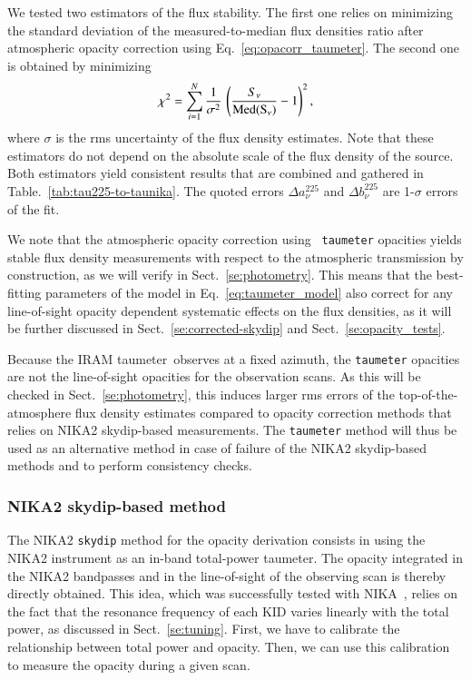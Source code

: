 \documentclass[traditionalabstract]{aa}
\newcommand{\taumeter}{taumeter}
\newcommand{\lp}[1]{#1}
\newcommand{\rev}[1]{#1}
\begin{document}
We tested two estimators of the flux stability. The first one relies
on minimizing the standard deviation of the measured-to-median flux
densities ratio after atmospheric opacity correction using
Eq.~\ref{eq:opacorr_taumeter}. The second one is obtained by minimizing
\begin{equation}
\chi^2 = \sum_{i=1}^{N} \frac{1}{\sigma^2} \, \left( \frac{S_\nu}{\rm{Med}(S_\nu)} -1 \right)^2,  
\end{equation}
where $\sigma$ is the rms uncertainty of the flux density estimates. Note
that these estimators do not depend on
the absolute scale of the flux density of the source. Both estimators
yield consistent results that are combined and gathered in
Table.~\ref{tab:tau225-to-taunika}. The quoted errors
$\Delta a_\nu^{225}$ and $\Delta b_\nu^{225}$ are 1-$\sigma$ errors of
the fit.

{\rev We note that the atmospheric opacity correction using {\tt
taumeter} opacities yields stable flux density measurements with
respect to the atmospheric transmission by construction, as we will
verify in Sect.~\ref{se:photometry}. This means that the best-fitting
parameters of the model in Eq.~\ref{eq:taumeter_model} also correct
for any line-of-sight opacity dependent systematic effects on the flux
densities, as it will be further discussed in
Sect.~\ref{se:corrected-skydip} and Sect.~\ref{se:opacity_tests}.}

Because the IRAM \taumeter\ observes at a fixed azimuth, the
{\tt taumeter} opacities are not the line-of-sight opacities
for the observation scans. As this will be checked in
Sect.~\ref{se:photometry}, this induces larger rms errors of
the top-of-the-atmosphere flux density estimates compared to
opacity correction methods that relies on NIKA2 skydip-based
measurements. The {\tt taumeter} method will thus be used
as an alternative method in case of failure of the NIKA2 skydip-based
methods and to perform consistency checks.


\subsubsection{NIKA2 skydip-based method}
\label{se:skydip-method}

The NIKA2 {\tt skydip} method for the opacity derivation consists in
using the NIKA2 instrument as an in-band total-power \taumeter. {\lp The opacity
integrated in the NIKA2 bandpasses and in the line-of-sight of the
observing scan is thereby directly obtained.} 
This idea,
which was successfully tested with NIKA~\citep{Catalano2014}, relies
on the fact that the resonance frequency of each KID varies linearly
with the total power, as discussed in Sect.~\ref{se:tuning}.
First, we have to calibrate the relationship between total
power and opacity. Then, we can use this calibration to measure the
opacity during a given scan. 
\end{document}
